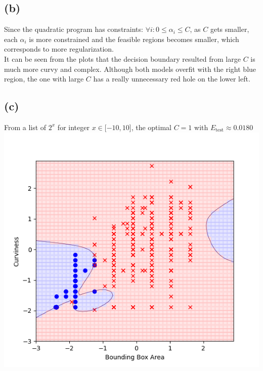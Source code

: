 \documentclass{article}
\begin{document}
	\subsection*{(b)}
		Since the quadratic program has constraints: $\forall i: 0 \leq \alpha_i \leq C$, as $C$ gets smaller, each $\alpha_i$ is more constrained and the feasible regions becomes smaller, which corresponds to more regularization.\\
		It can be seen from the plots that the decision boundary resulted from large $C$ is much more curvy and complex. Although both models overfit with the right blue region, the one with large $C$ has a really unnecessary red hole on the lower left.
		
	\subsection*{(c)}
		From a list of $2^x$ for integer $x \in [-10,10$], the optimal $C = 1$ with $E_\text{test} \approx 0.0180$\\
		\includegraphics[scale=0.7]{4c}
		
\end{document}

